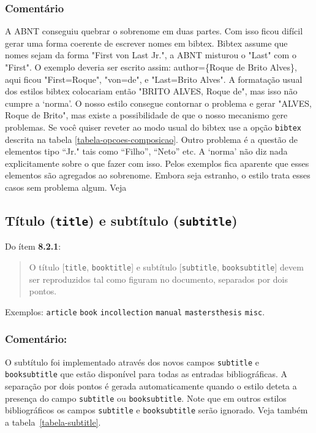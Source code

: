 \documentclass[a4paper]{ltxdoc}
\begin{document}
\subsubsection{Comentário}
A ABNT conseguiu quebrar o sobrenome em duas partes. Com isso ficou difícil
gerar uma forma coerente de escrever nomes em bibtex.
Bibtex assume que nomes sejam da forma "First von Last Jr.", a ABNT misturou
o "Last" com o "First". O exemplo  deveria ser
escrito assim: author=\{Roque de Brito Alves\}, aqui ficou "First=Roque",
"von=de",  e "Last=Brito Alves". A formatação usual dos 
estilos bibtex colocariam então "BRITO ALVES, Roque de",  mas isso não  cumpre
a `norma'. 
O nosso estilo consegue contornar o problema e gerar "ALVES, Roque de Brito",
mas existe a possibilidade de que o nosso mecanismo gere problemas.
Se você quiser reveter ao modo usual do bibtex use a opção
{\tt bibtex} descrita na tabela \ref{tabela-opcoes-composicao}.
Outro problema é a questão de elementos tipo ``Jr." tais como ``Filho'',
``Neto'' etc. A `norma' não diz nada explicitamente sobre o que fazer com isso.
Pelos exemplos fica aparente que esses elementos são agregados ao sobrenome.
Embora seja estranho, o estilo trata esses casos sem problema algum.
Veja 

\subsection{Título ({\tt title}) e subtítulo ({\tt subtitle})}

Do ítem {\bf 8.2.1}\cite{NBR6023:2000}:
\begin{quote}
O título [{\tt title}, {\tt booktitle}] e subtítulo [{\tt subtitle}, {\tt booksubtitle}] devem ser reproduzidos
tal como figuram no documento, separados por dois pontos.
\end{quote}

Exemplos:
{\tt article}\cite{7.4.2.3-2}
{\tt book}\cite{7.1.3-5,7.1.3-10,7.10-3,8.1.1.1-3,8.2.1,8.5.3}
{\tt incollection}\cite{7.2.2-1}
{\tt manual}\cite{NBR6023:2000,7.1.3-7,7.1.3-8,7.1.3-9,7.10-4,8.1.2.1-1}
{\tt mastersthesis}\cite{8.11.4-2}
{\tt misc}\cite{7.13.2-1}.

\subsubsection{Comentário:}
O subtítulo foi implementado através dos novos campos {\tt subtitle}
e {\tt booksubtitle} que
estão disponível para todas as entradas bibliográficas.
A separação por dois pontos é gerada automaticamente quando o estilo
deteta a presença do campo {\tt subtitle} ou {\tt booksubtitle}.
Note que em outros estilos bibliográficos os campos {\tt subtitle}
e {\tt booksubtitle} serão
ignorado.
Veja também a tabela~\ref{tabela-subtitle}.
\end{document}
